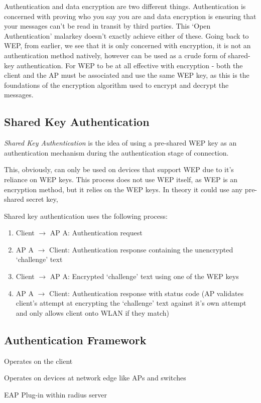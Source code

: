 Authentication and data encryption are two different things. Authentication is concerned with proving who you say you are and data encryption is ensuring that your messages can't be read in transit by third parties. This `Open Authentication' malarkey doesn't exactly achieve either of these. Going back to WEP, from earlier, we see that it is only concerned with encryption, it is not an authentication method natively, however can be used as a crude form of shared-key authentication. For WEP to be at all effective with encryption - both the client and the AP must be associated and use the same WEP key, as this is the foundations of the encryption algorithm used to encrypt and decrypt the messages. 

\subsection{Shared Key Authentication}
\textit{Shared Key Authentication} is the idea of using a pre-shared WEP key as an authentication mechanism during the authentication stage of connection.

This, obviously, can only be used on devices that support WEP due to it's reliance on WEP keys. This process does not use WEP itself, as WEP is an encryption method, but it relies on the WEP keys. In theory it could use any pre-shared secret key, 

Shared key authentication uses the following process:
\begin{enumerate}
    \item Client $\rightarrow$ AP A: Authentication request
    \item AP A $\rightarrow$ Client: Authentication response containing the unencrypted `challenge' text
    \item Client $\rightarrow$ AP A: Encrypted `challenge' text using one of the WEP keys
    \item AP A $\rightarrow$ Client: Authentication response with status code (AP validates client's attempt at encrypting the `challenge' text against it's own attempt and only allows client onto WLAN if they match)
\end{enumerate}


\subsection{Authentication Framework}
\begin{define}
\item[Supplicant] Operates on the client
\item[Authenticator] Operates on devices at network edge like APs and switches
\item[Authentication Server] EAP Plug-in within radius server  
\end{define}

